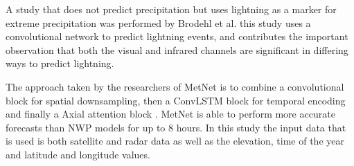A study that does not predict precipitation but uses lightning as a marker for extreme precipitation was performed by Brodehl et al. \cite{predictionLightning} this study uses a convolutional network to predict lightning events, and contributes the important observation that both the visual and infrared channels are significant in differing ways to predict lightning.
\medskip

The approach taken by the researchers of MetNet \cite{sønderby2020metnet} is to combine a convolutional block for spatial downsampling, then a ConvLSTM block for temporal encoding and finally a Axial attention block \cite{vaswani2017attention}. MetNet is able to perform more accurate forecasts than NWP models for up to 8 hours. In this study the input data that is used is both satellite and radar data as well as the elevation, time of the year and latitude and longitude values.